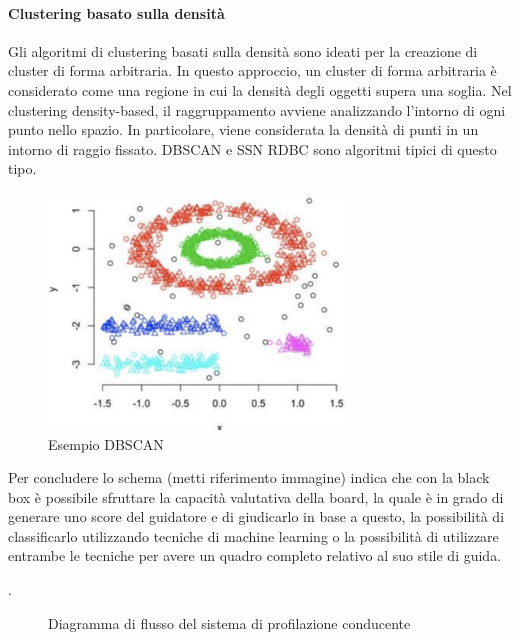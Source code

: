 \documentclass[12pt, a4paper, italian]{report}
\numberwithin{figure}{chapter}
\numberwithin{table}{chapter}
\begin{document}
\paragraph{Clustering basato sulla densità}
Gli algoritmi di clustering basati sulla densità sono ideati per la creazione di cluster di forma arbitraria. In questo approccio, un cluster di forma arbitraria è considerato come una regione in cui la densità degli oggetti supera una soglia. Nel clustering density-based, il raggruppamento avviene analizzando l'intorno di ogni punto nello spazio. In particolare, viene considerata la densità di punti in un intorno di raggio fissato. DBSCAN e SSN RDBC sono algoritmi tipici di questo tipo.

\begin{figure}[h] \centering
\includegraphics[width=8cm]{C_Density.png}
\caption{Esempio DBSCAN\protect\footnotemark}
\label{fig:qualcosa}
\end{figure}

Per concludere lo schema (metti riferimento immagine) indica che con la black box è possibile sfruttare la capacità valutativa della board, la quale è in grado di generare uno score del guidatore e di giudicarlo in base a questo, la possibilità di classificarlo utilizzando tecniche di machine learning o la possibilità di utilizzare entrambe le tecniche per avere un quadro completo relativo al suo stile di guida.

\vspace{1cm}
\cite{knuth1997}.
\begin{figure}[h]
\centering
{}
\caption{Diagramma di flusso del sistema di profilazione conducente}
\label{fig:flowchart}
\end{figure}

\printbibliography[title={Bibliografia}]
\end{document}

